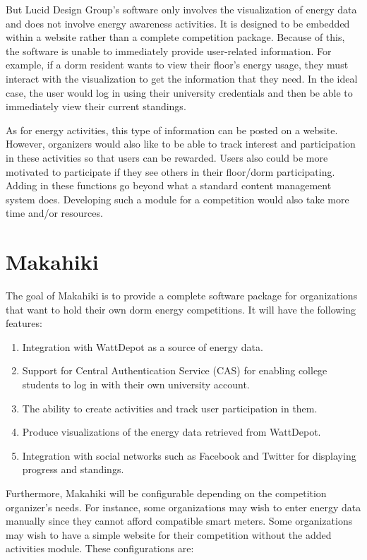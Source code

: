 But Lucid Design Group's software only involves the visualization of energy data and does not involve energy awareness activities.  It is designed to be embedded within a website rather than a complete competition package.  Because of this, the software is unable to immediately provide user-related information.  For example, if a dorm resident wants to view their floor's energy usage, they must interact with the visualization to get the information that they need.  In the ideal case, the user would log in using their university credentials and then be able to immediately view their current standings.

As for energy activities, this type of information can be posted on a website.  However, organizers would also like to be able to track interest and participation in these activities so that users can be rewarded.  Users also could be more motivated to participate if they see others in their floor/dorm participating.  Adding in these functions go beyond what a standard content management system does.  Developing such a module for a competition would also take more time and/or resources.

\section{Makahiki}

The goal of Makahiki is to provide a complete software package for organizations that want to hold their own dorm energy competitions.  It will have the following features:

\begin{enumerate}
	\item Integration with WattDepot as a source of energy data.
	\item Support for Central Authentication Service (CAS) for enabling college students to log in with their own university account.
	\item The ability to create activities and track user participation in them.
	\item Produce visualizations of the energy data retrieved from WattDepot.
	\item Integration with social networks such as Facebook and Twitter for displaying progress and standings.
\end{enumerate}

Furthermore, Makahiki will be configurable depending on the competition organizer's needs.  For instance, some organizations may wish to enter energy data manually since they cannot afford compatible smart meters.  Some organizations may wish to have a simple website for their competition without the added activities module.  These configurations are:


